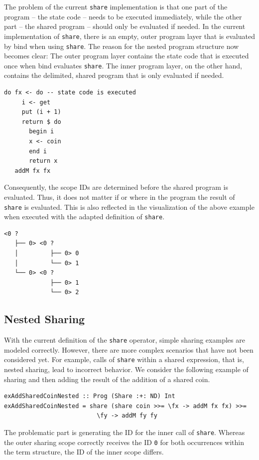 \documentclass[a4paper, 11pt, fleqn, twoside, abstract=on]{scrreprt}
\newcommand{\hinl}[1]{\texttt{#1}}
\begin{document}
The problem of the current \hinl{share} implementation is that one part of the program -- the state code -- needs to be executed immediately, while the other part -- the shared program -- should only be evaluated if needed.
In the current implementation of \hinl{share}, there is an empty, outer program layer that is evaluated by bind when using \hinl{share}.
The reason for the nested program structure now becomes clear: The outer program layer contains the state code that is executed once when bind evaluates \hinl{share}.
The inner program layer, on the other hand, contains the delimited, shared program that is only evaluated if needed.

\begin{verbatim}
do fx <- do -- state code is executed
     i <- get
     put (i + 1)
     return $ do
       begin i
       x <- coin
       end i
       return x
   addM fx fx
\end{verbatim}
\noindent
Consequently, the scope IDs are determined before the shared program is evaluated.
Thus, it does not matter if or where in the program the result of \hinl{share} is evaluated.
This is also reflected in the visualization of the above example when executed with the adapted definition of \hinl{share}.

\begin{verbatim}
<0 ? 
   ├── 0> <0 ? 
   │         ├── 0> 0
   │         └── 0> 1
   └── 0> <0 ? 
             ├── 0> 1
             └── 0> 2
\end{verbatim}

\subsection{Nested Sharing}
With the current definition of the \hinl{share} operator, simple sharing examples are modeled correctly.
However, there are more complex scenarios that have not been considered yet.
For example, calls of \hinl{share} within a shared expression, that is, nested sharing, lead to incorrect behavior.
We consider the following example of sharing and then adding the result of the addition of a shared coin.

\begin{verbatim}
exAddSharedCoinNested :: Prog (Share :+: ND) Int
exAddSharedCoinNested = share (share coin >>= \fx -> addM fx fx) >>= 
                          \fy -> addM fy fy
\end{verbatim}
\noindent
The problematic part is generating the ID for the inner call of \hinl{share}.
Whereas the outer sharing scope correctly receives the ID \hinl{0} for both occurrences within the term structure, the ID of the inner scope differs.
\end{document}
